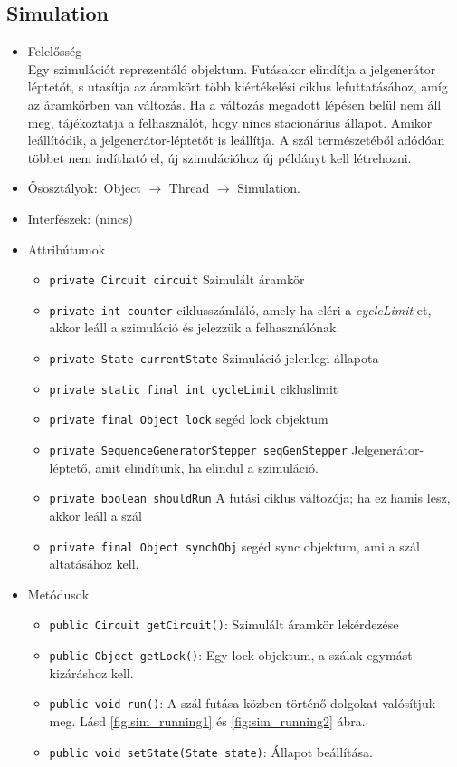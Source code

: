 \subsection{Simulation}
\begin{itemize}
\item Felelősség\\
Egy szimulációt reprezentáló objektum.  Futásakor elindítja a jelgenerátor léptetőt, s utasítja az áramkört több kiértékelési  ciklus lefuttatásához, amíg az áramkörben van változás. Ha a változás megadott lépésen belül  nem áll meg, tájékoztatja a felhasználót, hogy nincs stacionárius állapot.  Amikor leállítódik, a jelgenerátor-léptetőt is leállítja.  A szál természetéből adódóan többet nem indítható el, új szimulációhoz új példányt kell létrehozni.
\item Ősosztályok:\ Object $\rightarrow{}$ Thread $\rightarrow{}$ Simulation.
\item Interfészek: (nincs)
\item Attribútumok $\ $
\begin{itemize}
	\item \texttt{private Circuit circuit} Szimulált áramkör
	\item \texttt{private int counter} ciklusszámláló, amely ha eléri a \textit{cycleLimit}-et, akkor leáll a szimuláció és jelezzük a felhasználónak.
	\item \texttt{private State currentState} Szimuláció jelenlegi állapota
	\item \texttt{private static final int cycleLimit} cikluslimit
	\item \texttt{private final Object lock} segéd lock objektum
	\item \texttt{private SequenceGeneratorStepper seqGenStepper} Jelgenerátor-léptető, amit elindítunk, ha elindul a szimuláció.
	\item \texttt{private boolean shouldRun} A futási ciklus változója; ha ez hamis lesz, akkor leáll a szál
	\item \texttt{private final Object synchObj} segéd sync objektum, ami a szál altatásához kell.
\end{itemize}
\item Metódusok$\ $
\begin{itemize}
	\item \texttt{public Circuit getCircuit()}: Szimulált áramkör lekérdezése
	\item \texttt{public Object getLock()}: Egy lock objektum, a szálak egymást kizáráshoz kell.
	\item \texttt{public void run()}: A szál futása közben történő dolgokat valósítjuk meg. Lásd \ref{fig:sim_running1} és \ref{fig:sim_running2} ábra.
	\item \texttt{public void setState(State state)}: Állapot beállítása.
\end{itemize}
\end{itemize}

